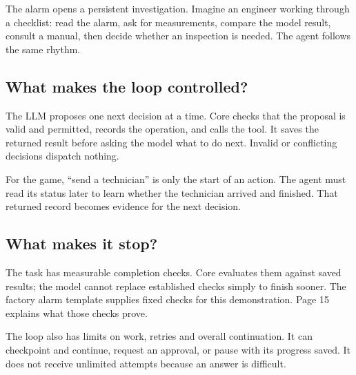 The alarm opens a persistent investigation. Imagine an engineer working through a checklist: read the alarm, ask for measurements, compare the model result, consult a manual, then decide whether an inspection is needed. The agent follows the same rhythm.


\subsection*{What makes the loop controlled?}
The LLM proposes one next decision at a time. Core checks that the proposal is valid and permitted, records the operation, and calls the tool. It saves the returned result before asking the model what to do next. Invalid or conflicting decisions dispatch nothing.

For the game, ``send a technician'' is only the start of an action. The agent must read its status later to learn whether the technician arrived and finished. That returned record becomes evidence for the next decision.

\subsection*{What makes it stop?}
The task has measurable completion checks. Core evaluates them against saved results; the model cannot replace established checks simply to finish sooner. The factory alarm template supplies fixed checks for this demonstration. Page 15 explains what those checks prove.

The loop also has limits on work, retries and overall continuation. It can checkpoint and continue, request an approval, or pause with its progress saved. It does not receive unlimited attempts because an answer is difficult.

